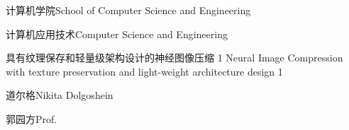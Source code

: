 
\school
{计算机学院}{School of Computer Science and Engineering}

\major
{计算机应用技术}{Computer Science and Engineering}

\thesistitle
{具有纹理保存和轻量级架构设计的神经图像压缩}
{1}
{Neural Image Compression with texture preservation and light-weight architecture design}
{1}

\thesisauthor
{道尔格}{Nikita Dolgoshein}

\teacher
{郭园方}{Prof.}






